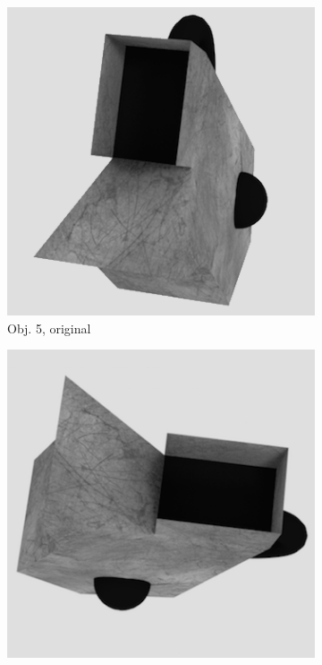 \begin{figure}
\medskip
\begin{subfigure}{0.2\textwidth}
\includegraphics[width=\linewidth]{Bilder/Objekt5A.png}
\caption{Obj. 5, original} \label{fig:c}
\end{subfigure}\hspace{.5cm} %
\begin{subfigure}{0.2\textwidth}
\includegraphics[width=\linewidth]{Bilder/Objekt5B.png}

\end{subfigure}
\end{figure}
